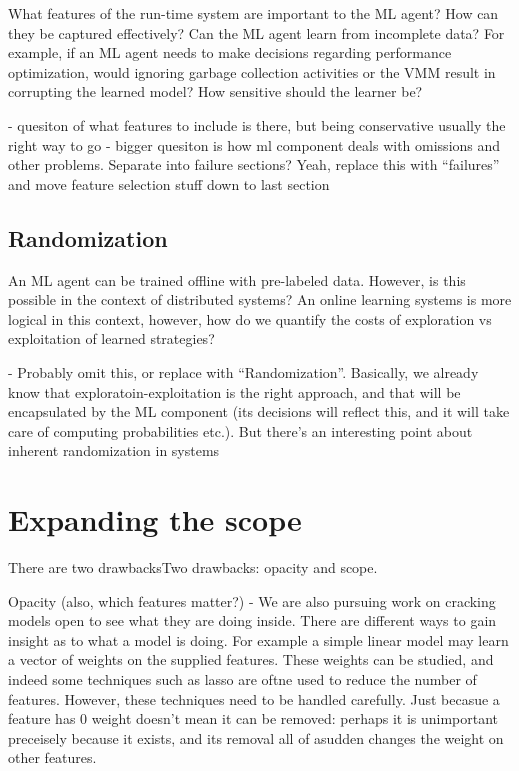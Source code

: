 \documentclass[a4paper,twocolumn]{article}
\begin{document}
What features of the run-time system are important to the ML agent? How can they
be captured effectively? Can the ML agent learn from incomplete data? For
example, if an ML agent needs to make decisions regarding performance
optimization, would ignoring garbage collection activities or the VMM result in
corrupting the learned model? How sensitive should the learner be?

- quesiton of what features to include is there, but being conservative usually the right
way to go
- bigger quesiton is how ml component deals with omissions and other problems. Separate
into failure sections? Yeah, replace this with ``failures'' and move feature selection stuff
down to last section

\subsection*{Randomization}

An ML agent can be trained offline with pre-labeled data. However, is this
possible in the context of distributed systems? An online learning systems is
more logical in this context, however, how do we quantify the costs of
exploration vs exploitation of learned strategies?

- Probably omit this, or replace with ``Randomization''. Basically, we already know
that exploratoin-exploitation is the right approach, and that will be encapsulated
by the ML component (its decisions will reflect this, and it will take care of
computing probabilities etc.). But there's an interesting point about inherent randomization
in systems

\section{Expanding the scope}

There are two drawbacksTwo drawbacks: opacity and scope.

Opacity (also, which features matter?)
- We are also pursuing work on cracking models open to see what they are doing inside.
There are different ways to gain insight as to what a model is doing. For example a simple
linear model may learn a vector of weights on the supplied features. These weights can be
studied, and indeed some techniques such as lasso are oftne used to reduce the number of features. However, these
techniques need to be handled carefully. Just becasue a feature has 0 weight doesn't mean it
can be removed: perhaps it is unimportant preceisely because it exists, and its removal all of
asudden changes the weight on other features.
\end{document}
